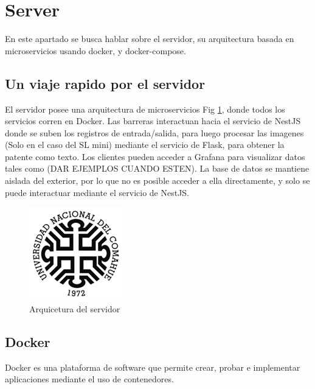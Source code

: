 \section{Server}

En este apartado se busca hablar sobre el servidor, su arquitectura basada en microservicios usando docker, y docker-compose.

\subsection{Un viaje rapido por el servidor}

El servidor posee una arquitectura de microservicios Fig \ref{fig:server}, donde todos los servicios corren en Docker. Las barreras interactuan hacia el servicio de NestJS donde se suben los registros de entrada/salida, para luego procesar las imagenes (Solo en el caso del SL mini) mediante el servicio de Flask, para obtener la patente como texto. Los clientes pueden acceder a Grafana para visualizar datos tales como (DAR EJEMPLOS CUANDO ESTEN). La base de datos se mantiene aislada del exterior, por lo que no es posible acceder a ella directamente, y solo se puede interactuar mediante el servicio de NestJS.

\begin{figure}
        \centering
        \includegraphics[width=.5\textwidth]{imgs/uncoma.png}
        \caption{Arquicetura del servidor}
        \label{fig:server}
\end{figure}

\subsection{Docker}

Docker es una plataforma de software que permite crear, probar e implementar aplicaciones mediante el uso de contenedores.

